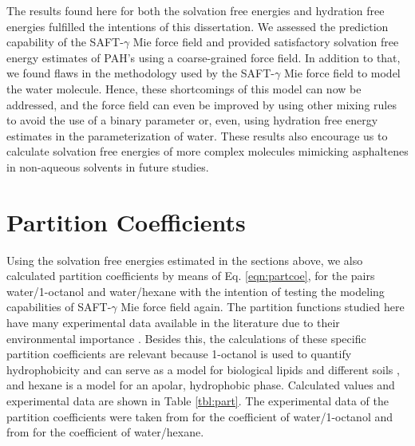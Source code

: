 The results found here for both the solvation free energies and hydration free energies fulfilled the intentions of this dissertation. We assessed the prediction capability of the SAFT-$\gamma$ Mie force field and provided satisfactory solvation free energy estimates of PAH's using a coarse-grained force field. In addition to that, we found flaws in the methodology used by the SAFT-$\gamma$ Mie force field to model the water molecule. Hence, these shortcomings of this model can now be addressed, and the force field can even be improved by using other mixing rules to avoid the use of a binary parameter or, even, using hydration free energy estimates in the parameterization of water. These results also encourage us to calculate solvation free energies of more complex molecules mimicking asphaltenes in non-aqueous solvents in future studies.  

\section{Partition Coefficients}

Using the solvation free energies estimated in the sections above, we also calculated partition coefficients by means of Eq. \eqref{eqn:partcoe}, for the pairs  water/1-octanol and water/hexane with the intention of testing the modeling capabilities of SAFT-$\gamma$ Mie force field again. The partition functions studied here have many experimental data available in the literature due to their environmental importance \cite{sangster}. Besides this, the calculations of these specific partition coefficients are relevant because   1-octanol is used to quantify hydrophobicity and can serve as a model for biological lipids and different soils \cite{RUELLE2000457}, and hexane is a model for an apolar, hydrophobic phase. Calculated values and experimental data are shown in Table \ref{tbl:part}. The experimental data of the partition coefficients were taken from    for the coefficient of water/1-octanol and from  for the coefficient of water/hexane. 

